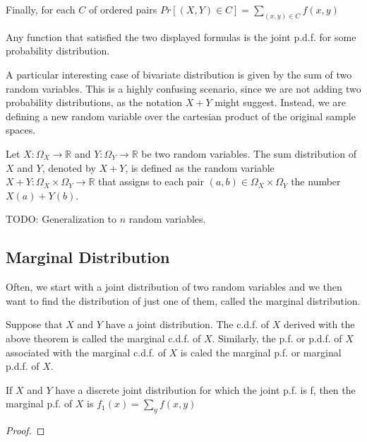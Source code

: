 Finally, for each $C$ of ordered pairs $Pr\left[\left(X,Y\right)\in C\right]=\sum_{\left(x,y\right)\in C}f\left(x,y\right)$

{\color{red} Any function that satisfied the two displayed formulas is the joint p.d.f. for some probability distribution.}

A particular interesting case of bivariate distribution is given by the sum of two random variables. This is a highly confusing scenario, since we are not adding two probability distributions, as the notation $X + Y$ might suggest. Instead, we are defining a new random variable over the cartesian product of the original sample spaces.

\begin{definition}
Let $X : \Omega_X \rightarrow \mathbb{R}$ and $Y : \Omega_Y \rightarrow \mathbb{R}$ be two random variables. The sum distribution of $X$ and $Y$, denoted by $X + Y$, is defined as the random variable $X + Y : \Omega_X \times \Omega_Y \rightarrow \mathbb{R}$ that assigns to each pair $\left( a, b \right) \in \Omega_X \times \Omega_Y$ the number $X(a) + Y(b)$.
\end{definition}

{\color{red} TODO: Generalization to $n$ random variables.}


\subsection{Marginal Distribution}

{\color{red} Often, we start with a joint distribution of two random variables and we then want to find the distribution of just one of them, called the marginal distribution.}

\begin{definition}
Suppose that $X$ and $Y$ have a joint distribution. The c.d.f. of $X$ derived with the above theorem is called the marginal c.d.f. of $X$. Similarly, the p.f. or p.d.f. of $X$ associated with the marginal c.d.f. of $X$ is caled the marginal p.f. or marginal p.d.f. of $X$.
\end{definition}

\begin{proposition}
If $X$ and $Y$ have a discrete joint distribution for which the joint p.f. is f, then the marginal p.f. of $X$ is $f_{1}\left(x\right)=\sum_{y}f\left(x,y\right)$
\end{proposition}
\begin{proof}
\end{proof}

